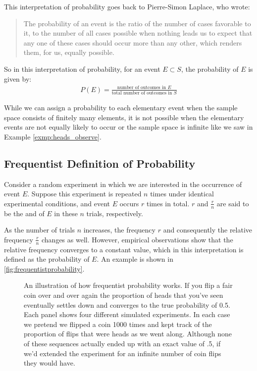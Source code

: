 This interpretation of probability goes back to Pierre-Simon Laplace, who wrote:
\begin{quote}
	The probability of an event is the ratio of the number of cases favorable to it, to the number of all cases possible when nothing leads us to expect that any one of these cases should occur more than any other, which renders them, for us, equally possible.
\end{quote}
So in this interpretation of probability, for an event \( E \subset S \), the probability of \( E \) is given by:
\begin{align*}
	P(E) = \frac{\text{number of outcomes in }E}{\text{total number of outcomes in }S}
\end{align*}

While we can assign a probability to each elementary event when the sample space consists of finitely many elements,
it is not possible when the elementary events are not equally likely to occur or the sample space is infinite like we saw in Example \autoref{exmp:heads_observe}.

\subsection{Frequentist Definition of Probability}

Consider a random experiment in which we are interested in the occurrence of event \( E \).
Suppose this experiment is repeated \( n \) times under identical experimental conditions,
and event \( E \) occurs \( r \) times in total.
\( r \) and \( \frac{r}{n} \) are said to be the  and  of \( E \) in these
\( n \) trials, respectively.

As the number of trials \( n \) increases, the frequency \( r \) and consequently the relative frequency \( \frac{r}{n} \) changes as well.
However, empirical observations show that the relative frequency converges to a constant value, which in this interpretation is defined as the probability of \( E \).
An example is shown in \autoref{fig:frequentistprobability}.

\begin{figure}[p]
\begin{center}
\caption{An illustration of how frequentist probability works. If you flip a fair coin over and over again the proportion of heads that you've seen eventually settles down and converges to the true probability of 0.5. Each panel shows four different simulated experiments. In each case we pretend we flipped a coin 1000 times and kept track of the proportion of flips that were heads as we went along. Although none of these sequences actually ended up with an exact value of .5, if we'd extended the experiment for an infinite number of coin flips they would have.}
\label{fig:frequentistprobability}
\end{center}
\end{figure}

